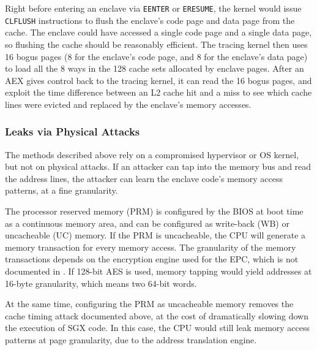 Right before entering an enclave via \texttt{EENTER} or \texttt{ERESUME}, the
kernel would issue \texttt{CLFLUSH} instructions to flush the enclave's code
page and data page from the cache. The enclave could have accessed a single
code page and a single data page, so flushing the cache should be reasonably
efficient. The tracing kernel then uses 16 bogus pages (8 for the enclave's
code page, and 8 for the enclave's data page) to load all the 8 ways in the 128
cache sets allocated by enclave pages. After an AEX gives control back to the
tracing kernel, it can read the 16 bogus pages, and exploit the time difference
between an L2 cache hit and a miss to see which cache lines were evicted and
replaced by the enclave's memory accesses.

\subsubsection{Leaks via Physical Attacks}

The methods described above rely on a compromised hypervisor or OS kernel, but
not on physical attacks. If an attacker can tap into the memory bus and read
the address lines, the attacker can learn the enclave code's memory access
patterns, at a fine granularity.

The processor reserved memory (PRM) is configured by the BIOS at boot time as
a continuous memory area, and can be configured as write-back (WB) or
uncacheable (UC) memory. If the PRM is uncacheable, the CPU will generate a
memory transaction for every memory access. The granularity of the memory
transactions depends on the encryption engine used for the EPC, which is not
documented in \cite{intel2015sdm}. If 128-bit AES is used, memory tapping
would yield addresses at 16-byte granularity, which means two 64-bit words.

At the same time, configuring the PRM as uncacheable memory removes the cache
timing attack documented above, at the cost of dramatically slowing down the
execution of SGX code. In this case, the CPU would still leak memory access
patterns at page granularity, due to the address translation engine.
